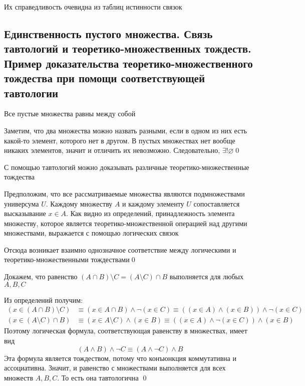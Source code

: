 \documentclass[a4paper]{article}
\begin{document}
Их справедливость очевидна из таблиц истинности связок

\subsection{Единственность пустого множества. Связь тавтологий и теоретико-множественных тождеств. Пример доказательства теоретико-множественного тождества при помощи соответствующей тавтологии}
\theorem Все пустые множества равны между собой

\proof Заметим, что два множества можно назвать разными, если в одном из них есть какой-то элемент, которого нет в другом. В пустых множествах нет вообще никаких элементов, значит и отличить их невозможно. Следовательно, $\exists!\varnothing$\qed

\label{sec:2.2}\theorem С помощью тавтологий можно доказывать различные теоретико-множественные тождества

\proof Предположим, что все рассматриваемые множества являются подмножествами универсума $U$. Каждому множеству $A$ и каждому элементу $U$ сопоставляется высказывание $x\in A$. Как видно из определений, принадлежность элемента множеству, которое является теоретико-множественной операцией над другими множествами, выражается с помощью логических связок

Отсюда возникает взаимно однозначное соответствие между логическими и теоретико-множественными тождествами\qed 

\ex Докажем, что равенство $(A\cap B)\setminus C=(A\setminus C)\cap B$ выполняется для любых $A, B, C$

Из определений получим:
\begin{equation*}
    \begin{aligned}
        (x\in(A\cap B)\setminus C)&\equiv (x\in A\cap B)\wedge\neg(x\in C)\equiv((x\in A)\wedge(x\in B))\wedge\neg(x\in C)\\
        (x\in (A\setminus C)\cap B)&\equiv(x\in A\setminus C)\wedge(x\in B)\equiv((x\in A)\wedge\neg(x\in C))\wedge(x\in B)
    \end{aligned}
\end{equation*}
Поэтому логическая формула, соответствующая равенству в множествах, имеет вид 
\begin{equation*}
    (A\wedge B)\wedge\neg C\equiv(A\wedge\neg C)\wedge B
\end{equation*}
Эта формула является тождеством, потому что конъюнкция коммутативна и ассоциативна. Значит, и равенство с множествами выполняется для всех множеств $A, B, C$. То есть она тавтологична \qed
\end{document}
